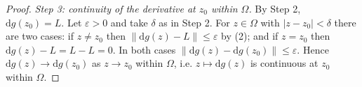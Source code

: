 \begin{proof}
\emph{Step 3: continuity of the derivative at $z_0$ within $\Omega$.}  By
Step 2, $\mathrm{d}g(z_0)=L$.  Let $\varepsilon>0$ and take $\delta$ as in
Step 2.  For $z\in\Omega$ with $|z-z_0|<\delta$ there are two cases: if
$z\neq z_0$ then $\|\mathrm{d}g(z)-L\|\le\varepsilon$ by (2); and if $z=z_0$
then $\mathrm{d}g(z)-L=L-L=0$.  In both cases
$\|\mathrm{d}g(z)-\mathrm{d}g(z_0)\|\le\varepsilon$.  Hence
$\mathrm{d}g(z)\to\mathrm{d}g(z_0)$ as $z\to z_0$ within $\Omega$, i.e.
$z\mapsto\mathrm{d}g(z)$ is continuous at $z_0$ within $\Omega$.
\end{proof}
